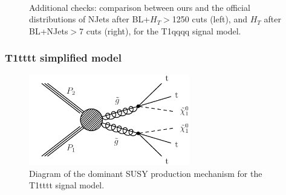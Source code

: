         \begin{figure}
        \centering
        \hspace{-1 cm}
        ~ %
        \caption{Additional checks: comparison between ours and the official distributions of NJets after BL+$H_T$$>$1250 cuts (left), and $H_T$ after BL+NJets$>$7 cuts (right), for the T1qqqq signal model.}
        \end{figure}        

\clearpage
\subsubsection{T1tttt simplified model}

\begin{figure}[h!]
\centering
\includegraphics[width=7cm]{figures/Appendices/Ma5ValidationSUS13012/T1tttt.pdf}
\caption{Diagram of the dominant SUSY production mechanism
for the T1tttt signal model.}
\label{fig:T1tttt}
\end{figure}

